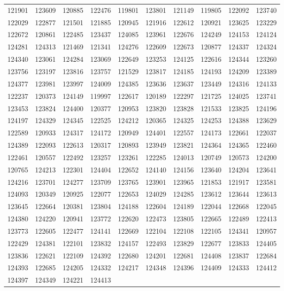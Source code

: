\documentclass[11pt]{article}
\numberwithin{equation}{section}
\theoremstyle{definition}
\theoremstyle{remark}
\begin{document}
{\begin{longtable}{rrrrrrrrrr}
121901 & 123609 & 120885 & 122476 & 119801 & 123801 & 121149 & 119805 & 122092 & 123740\\
122029 & 122877 & 121501 & 121885 & 120945 & 121916 & 122612 & 120921 & 123625 & 123229\\
122672 & 120861 & 122485 & 123437 & 124085 & 123961 & 122676 & 124249 & 124153 & 124124\\
124281 & 124313 & 121469 & 121341 & 124276 & 122609 & 122673 & 120877 & 124337 & 124324\\
124340 & 123061 & 124284 & 123069 & 122649 & 123253 & 124125 & 122616 & 124344 & 123260\\
123756 & 123197 & 123816 & 123757 & 121529 & 123817 & 124185 & 124193 & 124209 & 123389\\
124377 & 123981 & 123997 & 124009 & 124385 & 123636 & 123637 & 123449 & 124316 & 124133\\
122237 & 120373 & 124149 & 119997 & 122617 & 120189 & 122297 & 121725 & 124025 & 123741\\
123453 & 123824 & 124400 & 120377 & 120953 & 123820 & 123828 & 121533 & 123825 & 124196\\
124197 & 124329 & 124345 & 122525 & 124212 & 120365 & 124325 & 124253 & 124388 & 123629\\
122589 & 120933 & 124317 & 124172 & 120949 & 124401 & 122557 & 124173 & 122661 & 122037\\
124389 & 122093 & 122613 & 120317 & 120893 & 123949 & 123821 & 124364 & 124365 & 122460\\
122461 & 120557 & 122492 & 123257 & 123261 & 122285 & 124013 & 120749 & 120573 & 124200\\
120765 & 124213 & 122301 & 124404 & 122652 & 124140 & 124156 & 123640 & 124204 & 123641\\
124216 & 123701 & 124277 & 123709 & 123765 & 123901 & 123965 & 121853 & 121917 & 123581\\
124093 & 120349 & 120925 & 122077 & 122653 & 124029 & 124285 & 123612 & 123644 & 123613\\
123645 & 122664 & 120381 & 123804 & 124188 & 122604 & 124189 & 122044 & 122668 & 122045\\
124380 & 124220 & 120941 & 123772 & 122620 & 122473 & 123805 & 122665 & 122489 & 122413\\
123773 & 122605 & 122477 & 124141 & 122669 & 122104 & 122108 & 122105 & 124341 & 120957\\
122429 & 124381 & 122101 & 123832 & 124157 & 122493 & 123829 & 122677 & 123833 & 124405\\
123836 & 122621 & 122109 & 124392 & 122680 & 124201 & 122681 & 124408 & 123837 & 122684\\
124393 & 122685 & 124205 & 124332 & 124217 & 124348 & 124396 & 124409 & 124333 & 124412\\
124397 & 124349 & 124221 & 124413 & & & & & &\\
\end{longtable}}
\end{document}
